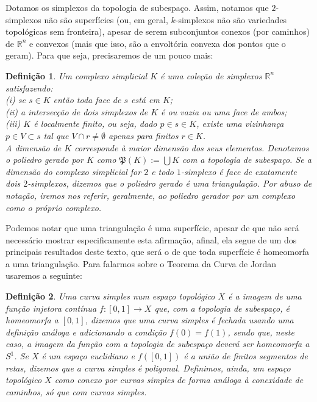 \documentclass[12pt,a4paper]{article}
\newtheorem{mydef}{Definição}[section]
\theoremstyle{definition}
\begin{document}
Dotamos os simplexos da topologia de subespaço. Assim, notamos que $2$-simplexos não são superfícies (ou, em geral, $k$-simplexos não são variedades topológicas sem fronteira), apesar de serem subconjuntos conexos (por caminhos) de $\mathbb{R}^n$ e convexos (mais que isso, são a envoltória convexa dos pontos que o geram). Para que seja, precisaremos de um pouco mais: 

\begin{mydef}

    Um complexo simplicial $K$ é uma coleção de simplexos $\mathbb{R}^n$ satisfazendo: \\
    
    (i) se $s\in K$ então toda face de $s$ está em $K$; \\
    
    (ii) a intersecção de dois simplexos de $K$ é ou vazia ou uma face de ambos; \\
    
    (iii) $K$ é localmente finito, ou seja, dado $p\in s\in K$, existe uma vizinhança $p\in V\subset s$ tal que $V\cap r \neq \emptyset$ apenas para finitos $r\in K$. \\
    
    A dimensão de $K$ corresponde à maior dimensão dos seus elementos. Denotamos o poliedro gerado por $K$ como $\mathfrak{P}(K):=\bigcup K$ com a topologia de subespaço. Se a dimensão do complexo simplicial for $2$ e todo $1$-simplexo é face de exatamente dois $2$-simplexos, dizemos que o poliedro gerado é uma triangulação. Por abuso de notação, iremos nos referir, geralmente, ao poliedro gerador por um complexo como o próprio complexo.  

\end{mydef}

Podemos notar que uma triangulação é uma superfície, apesar de que não será necessário mostrar especificamente esta afirmação, afinal, ela segue de um dos principais resultados deste texto, que será o de que toda superfície é homeomorfa a uma triangulação. Para falarmos sobre o Teorema da Curva de Jordan usaremos a seguinte:

\begin{mydef}

    Uma curva simples num espaço topológico $X$ é a imagem de uma função injetora contínua $f:[0,1]\rightarrow X$ que, com a topologia de subespaço, é homeomorfa a $[0,1]$, dizemos que uma curva simples é fechada usando uma definição análoga e adicionando a condição $f(0)=f(1)$, sendo que, neste caso, a imagem da função com a topologia de subespaço deverá ser homeomorfa a $S^1$. Se $X$ é um espaço euclidiano e $f([0,1])$ é a união de finitos segmentos de retas, dizemos que a curva simples é poligonal. Definimos, ainda, um espaço topológico $X$ como conexo por curvas simples de forma análoga à conexidade de caminhos, só que com curvas simples. 

\end{mydef}
\end{document}
